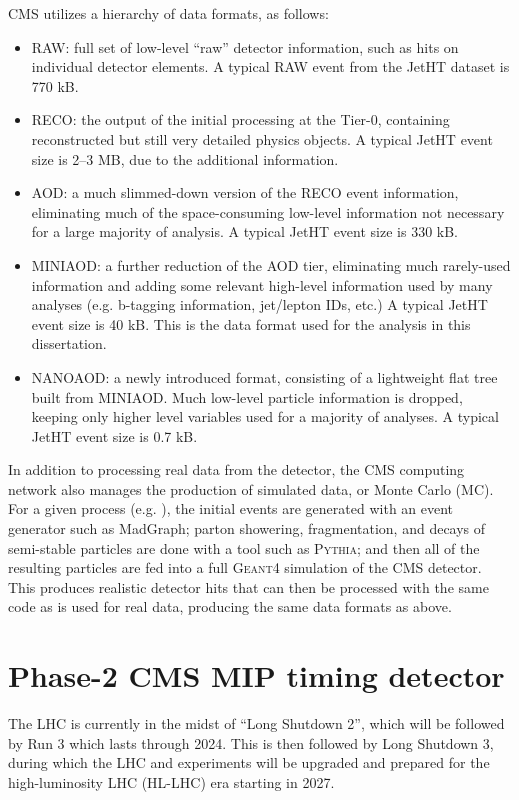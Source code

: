 CMS utilizes a hierarchy of data formats, as follows:
\vspace{-2mm}
\begin{itemize}\setlength\itemsep{-1mm}
\item {RAW}: full set of low-level ``raw'' detector information, such as hits on individual detector elements.
A typical {RAW} event from the JetHT dataset is 770 kB.
\item {RECO}: the output of the initial processing at the Tier-0, containing reconstructed but still very detailed physics objects.
A typical JetHT event size is 2--3 MB, due to the additional information.
\item {AOD}: a much slimmed-down version of the {RECO} event information, eliminating much of
the space-consuming low-level information not necessary for a large majority of analysis. A typical JetHT event
size is 330 kB.
\item {MINIAOD}: a further reduction of the {AOD} tier, eliminating much rarely-used information
and adding some relevant high-level information used by many analyses (e.g. b-tagging information, jet/lepton IDs, etc.)
A typical JetHT event size is 40 kB. This is the data format used for the analysis in this dissertation.
\item NANOAOD: a newly introduced format, consisting of a lightweight flat tree built from MINIAOD. Much low-level
particle information is dropped, keeping only higher level variables used for a majority of analyses.
A typical JetHT event size is 0.7 kB.
\end{itemize}

In addition to processing real data from the detector, the CMS computing network also manages the production
of simulated data, or Monte Carlo (MC). For a given process (e.g. \zll), the initial events
are generated with an event generator such as MadGraph; parton showering, fragmentation, and decays
of semi-stable particles are done with a tool such as \textsc{Pythia}; and then all of the resulting
particles are fed into a full \textsc{Geant4} simulation of the CMS detector. This produces
realistic detector hits that can then be processed with the same code as is used for real data,
producing the same data formats as above.

\section{Phase-2 CMS MIP timing detector}

The LHC is currently in the midst of ``Long Shutdown 2'', which will be followed by Run 3 which lasts
through 2024. This is then followed by Long Shutdown 3, during which the LHC and experiments will
be upgraded and prepared for the high-luminosity LHC (HL-LHC) era starting in 2027.

